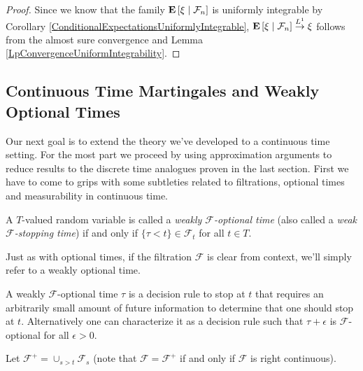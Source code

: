 \begin{proof}
Since we know that the family $\textbf{E}\left[ \xi \mid \mathcal{F}_n \right]$
is uniformly integrable by Corollary
\ref{ConditionalExpectationsUniformlyIntegrable},
$\textbf{E}\left[ \xi \mid \mathcal{F}_n \right] \overset{L^1}\to \xi$ follows from the
almost sure convergence and Lemma \ref{LpConvergenceUniformIntegrability}.
\end{proof}

\subsection {Continuous Time Martingales and Weakly Optional Times}

Our next goal is to extend the theory we've developed to a continuous
time setting.  For the most part we proceed by using approximation
arguments to reduce results to the discrete time analogues proven in
the last section.  First we have to come to grips with some subtleties
related to filtrations, optional times and measurability in continuous
time.

\begin{defn}A $T$-valued random variable is called a
  \emph{weakly $\mathcal{F}$-optional time} (also called a
  \emph{weak $\mathcal{F}$-stopping time}) if and only if $\lbrace \tau <
  t \rbrace \in \mathcal{F}_t$ for all $t \in T$.  
\end{defn}
Just as with optional times, if the filtration $\mathcal{F}$ is clear
from context, we'll simply refer to a weakly optional time.

A weakly $\mathcal{F}$-optional time $\tau$ is a decision rule to stop
at $t$ that requires an arbitrarily small amount of future information
to determine that one should stop at $t$.  Alternatively one can
characterize it as a decision rule such that $\tau + \epsilon$ is
$\mathcal{F}$-optional for all $\epsilon>0$.

Let $\mathcal{F}^+ = \cup_{s>t} \mathcal{F}_s$ (note that $\mathcal{F}
= \mathcal{F}^+$ if and only if $\mathcal{F}$ is right continuous).

